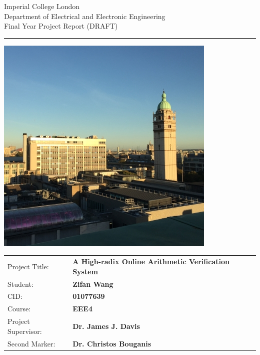 \begin{titlepage}
  \setlength{\parindent}{0pt}
  \setlength{\parskip}{0pt}

  { \Large
    Imperial College London\\[17pt]
    Department of Electrical and Electronic Engineering\\[17pt]
    Final Year Project Report (DRAFT)
  }

  \rule{\columnwidth}{3pt}
  \vfill
  \centering
  \includegraphics[width=0.7\columnwidth]{img/1.jpg}
  \vfill

  \begin{table}[h]
  \def\arraystretch{1.8}
    \begin{tabular}{p{40mm}p{\dimexpr\columnwidth-40mm}}
      Project Title: & \textbf{A High-radix Online Arithmetic Verification System} \\
      Student:       & \textbf{Zifan Wang} \\
      CID:           & \textbf{01077639} \\
      Course:        & \textbf{EEE4} \\
      Project Supervisor: & \textbf{Dr. James J. Davis} \\
      Second Marker: & \textbf{Dr. Christos Bouganis}
    \end{tabular}
  \end{table}
\end{titlepage}